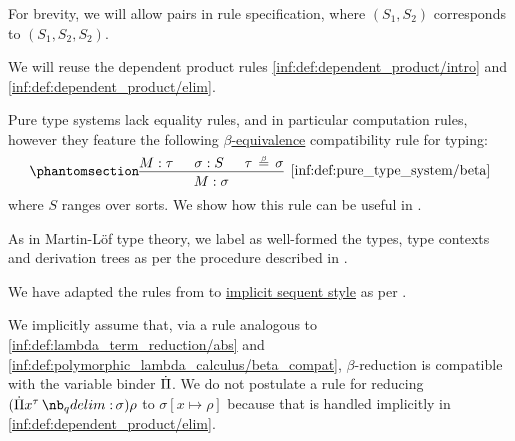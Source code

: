 \begin{definition}
\begin{thmenum}
    For brevity, we will allow pairs in rule specification, where \( (S_1, S_2) \) corresponds to \( (S_1, S_2, S_2) \).
  \end{thmenum}

  We will reuse the dependent product rules \ref{inf:def:dependent_product/intro} and \ref{inf:def:dependent_product/elim}.

  Pure type systems lack equality rules, and in particular computation rules, however they feature the following \hyperref[def:typed_term_reduction]{\( \beta \)-equivalence} compatibility rule for typing:
  \begin{equation*}\taglabel[\ensuremath{ \logic{Conv} }]{inf:def:pure_type_system/beta}
    \begin{prooftree}
      \hypo{ M: \tau }
      \hypo{ \sigma: S }
      \hypo{ \tau \equivrel{\beta} \sigma }
      \infer3[\ref{inf:def:pure_type_system/beta}]{ M: \sigma },
    \end{prooftree}
  \end{equation*}
  where \( S \) ranges over sorts. We show how this rule can be useful in .

  As in Martin-L\"of type theory, we label as well-formed the types, type contexts and derivation trees as per the procedure described in .
\end{definition}
\begin{comments}
  \item We have adapted the rules from \cite[\S 5.2]{Barendregt1992LambdaCalculiWithTypes} to \hyperref[rem:natural_deduction_explicit_sequents]{implicit sequent style} as per .

  \item We implicitly assume that, via a rule analogous to \ref{inf:def:lambda_term_reduction/abs} and \ref{inf:def:polymorphic_lambda_calculus/beta_compat}, \( \beta \)-reduction is compatible with the variable binder \( \dot{\Pi} \). We do not postulate a rule for reducing \( (\qprod {x^\tau} \sigma) \rho \) to \( \sigma[x \mapsto \rho] \) because that is handled implicitly in \ref{inf:def:dependent_product/elim}.
\end{comments}

